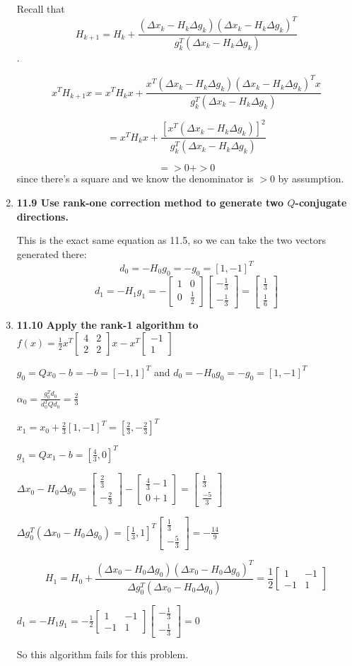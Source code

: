 \documentclass[10pt,a4paper]{article}
\newcommand\m[1]{\begin{bmatrix}#1\end{bmatrix}}
\begin{document}
\begin{enumerate}
    Recall that $$H_{k+1} = H_k + \frac{(\Delta x_k - H_k \Delta g_k)(\Delta x_k - H_k \Delta g_k)^T}{g_k^T(\Delta x_k - H_k \Delta g_k)}$$. 

    $$x^TH_{k+1}x = x^TH_kx + \frac{x^T(\Delta x_k - H_k \Delta g_k)(\Delta x_k - H_k \Delta g_k)^Tx}{g_k^T(\Delta x_k - H_k \Delta g_k)}$$

    $$ = x^TH_kx + \frac{[x^T(\Delta x_k - H_k \Delta g_k)]^2}{g_k^T(\Delta x_k - H_k \Delta g_k)}$$

    $$ = > 0 + > 0$$ since there's a square and we know the denominator is $>0$ by assumption.

    \item \textbf{11.9 Use rank-one correction method to generate two $Q$-conjugate directions.}
    
    This is the exact same equation as 11.5, so we can take the two vectors generated there:
    $$d_0 = -H_0g_0 = -g_0 = [1, -1]^T$$
    $$d_1 = -H_1g_1 =  - \m{1 & 0 \\0 & \frac{1}{2}} \m{-\frac{1}{3} \\ -\frac{1}{3}} = \m{\frac{1}{3} \\ \frac{1}{6}}$$

    \item \textbf{11.10 Apply the rank-1 algorithm to $f(x) = \frac{1}{2} x^T\m{4 & 2 \\ 2 & 2} x - x^T\m{-1 \\1} $}
    
    $g_0 = Qx_0 -b = -b = [-1, 1]^T$ and $d_0 = -H_0g_0 = -g_0 = [1, -1]^T$

    $\alpha_0 = \frac{g_0^Td_0}{d_0^TQd_0} = \frac{2}{3}$

    $x_1 = x_0 + \frac{2}{3}[1, -1]^T = [\frac{2}{3}, -\frac{2}{3}]^T$

    $g_1 = Qx_1 -b = [\frac{4}{3}, 0]^T$

    $\Delta x_0 - H_0 \Delta g_0 = \begin{bmatrix}  \frac{2}{3} \\ -\frac{2}{3}\end{bmatrix} - \begin{bmatrix} \frac{4}{3} -1 \\ 0 +1 \end{bmatrix} = \begin{bmatrix}\frac{1}{3} \\ \frac{-5}{3}\end{bmatrix}$

    $\Delta g_0^T(\Delta x_0 - H_0 \Delta g_0) =  [\frac{1}{3}, 1]^T\m{\frac{1}{3} \\ -\frac{5}{3}} = -\frac{14}{9}$
    
    $$H_1 = H_0 + \frac{(\Delta x_0 - H_0 \Delta g_0)(\Delta x_0 - H_0 \Delta g_0)^T}{\Delta g_0^T(\Delta x_0 - H_0 \Delta g_0)} = \frac{1}{2} \m{1 & -1 \\ -1 & 1}$$

    $d_1 = -H_1g_1 =  - \frac{1}{2}\m{1 & -1 \\-1 & 1} \m{-\frac{1}{3} \\ -\frac{1}{3}} = 0$

    So this algorithm fails for this problem.

\end{enumerate}
\end{document}
